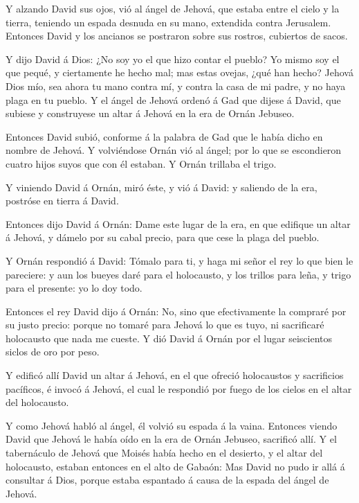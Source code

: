  Y alzando David sus ojos, vió al ángel de Jehová, que
estaba entre el cielo y la tierra, teniendo un espada desnuda en su
mano, extendida contra Jerusalem. Entonces David y los ancianos se
postraron sobre sus rostros, cubiertos de sacos.

 Y dijo David á Dios: ¿No soy yo el que hizo contar el
pueblo? Yo mismo soy el que pequé, y ciertamente he hecho mal; mas estas
ovejas, ¿qué han hecho? Jehová Dios mío, sea ahora tu mano contra mí, y
contra la casa de mi padre, y no haya plaga en tu pueblo. 
Y el ángel de Jehová ordenó á Gad que dijese á David, que subiese y
construyese un altar á Jehová en la era de Ornán Jebuseo.

 Entonces David subió, conforme á la palabra de Gad que le
había dicho en nombre de Jehová.  Y volviéndose Ornán vió
al ángel; por lo que se escondieron cuatro hijos suyos que con él
estaban. Y Ornán trillaba el trigo.

 Y viniendo David á Ornán, miró éste, y vió á David: y
saliendo de la era, postróse en tierra á David.

 Entonces dijo David á Ornán: Dame este lugar de la era, en
que edifique un altar á Jehová, y dámelo por su cabal precio, para que
cese la plaga del pueblo.

 Y Ornán respondió á David: Tómalo para ti, y haga mi señor
el rey lo que bien le pareciere: y aun los bueyes daré para el
holocausto, y los trillos para leña, y trigo para el presente: yo lo doy
todo.

 Entonces el rey David dijo á Ornán: No, sino que
efectivamente la compraré por su justo precio: porque no tomaré para
Jehová lo que es tuyo, ni sacrificaré holocausto que nada me cueste.
 Y dió David á Ornán por el lugar seiscientos siclos de oro
por peso.

 Y edificó allí David un altar á Jehová, en el que ofreció
holocaustos y sacrificios pacíficos, é invocó á Jehová, el cual le
respondió por fuego de los cielos en el altar del holocausto.

 Y como Jehová habló al ángel, él volvió su espada á la
vaina.  Entonces viendo David que Jehová le había oído en
la era de Ornán Jebuseo, sacrificó allí.  Y el tabernáculo
de Jehová que Moisés había hecho en el desierto, y el altar del
holocausto, estaban entonces en el alto de Gabaón: Mas David no pudo ir
allá á consultar á Dios, porque estaba espantado á causa de la espada
del ángel de Jehová.

